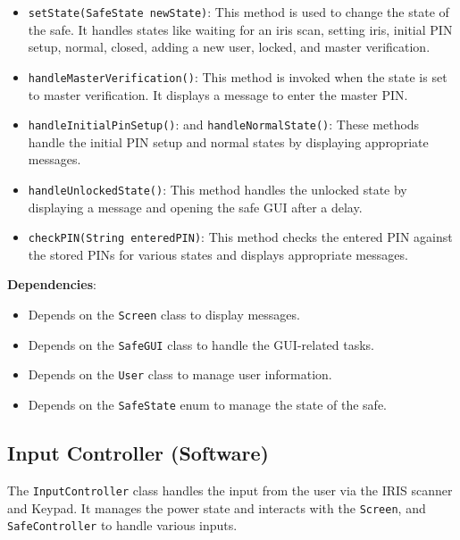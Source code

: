 \documentclass{article}
\begin{document}
\begin{itemize}
    \item \texttt{setState(SafeState newState)}: This method is used to change the state of the safe. It handles states like waiting for an iris scan, setting iris, initial PIN setup, normal, closed, adding a new user, locked, and master verification.
    \item \texttt{handleMasterVerification()}: This method is invoked when the state is set to master verification. It displays a message to enter the master PIN.
    \item \texttt{handleInitialPinSetup()}: and \texttt{handleNormalState()}: These methods handle the initial PIN setup and normal states by displaying appropriate messages.
    \item \texttt{handleUnlockedState()}: This method handles the unlocked state by displaying a message and opening the safe GUI after a delay.
    \item \texttt{checkPIN(String enteredPIN)}: This method checks the entered PIN against the stored PINs for various states and displays appropriate messages.
\end{itemize}
\textbf{Dependencies}:
\begin{itemize}
    \item Depends on the \texttt{Screen} class to display messages.
    \item Depends on the \texttt{SafeGUI} class to handle the GUI-related tasks.
    \item Depends on the \texttt{User} class to manage user information.
    \item Depends on the \texttt{SafeState} enum to manage the state of the safe.
\end{itemize}

\subsection{Input Controller (Software)}
The \texttt{InputController} class handles the input from the user via the IRIS scanner and Keypad. It manages the power state and interacts with the \texttt{Screen}, and \texttt{SafeController} to handle various inputs.
\end{document}
